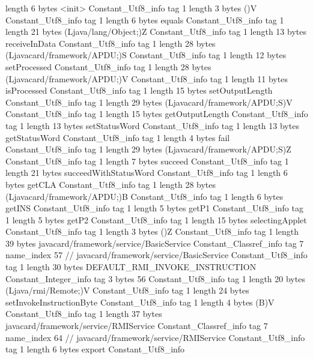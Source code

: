 {{{			length	6
			bytes	<init>
		}
		Constant_Utf8_info {
			tag	1
			length	3
			bytes	()V
		}
		Constant_Utf8_info {
			tag	1
			length	6
			bytes	equals
		}
		Constant_Utf8_info {
			tag	1
			length	21
			bytes	(Ljava/lang/Object;)Z
		}
		Constant_Utf8_info {
			tag	1
			length	13
			bytes	receiveInData
		}
		Constant_Utf8_info {
			tag	1
			length	28
			bytes	(Ljavacard/framework/APDU;)S
		}
		Constant_Utf8_info {
			tag	1
			length	12
			bytes	setProcessed
		}
		Constant_Utf8_info {
			tag	1
			length	28
			bytes	(Ljavacard/framework/APDU;)V
		}
		Constant_Utf8_info {
			tag	1
			length	11
			bytes	isProcessed
		}
		Constant_Utf8_info {
			tag	1
			length	15
			bytes	setOutputLength
		}
		Constant_Utf8_info {
			tag	1
			length	29
			bytes	(Ljavacard/framework/APDU;S)V
		}
		Constant_Utf8_info {
			tag	1
			length	15
			bytes	getOutputLength
		}
		Constant_Utf8_info {
			tag	1
			length	13
			bytes	setStatusWord
		}
		Constant_Utf8_info {
			tag	1
			length	13
			bytes	getStatusWord
		}
		Constant_Utf8_info {
			tag	1
			length	4
			bytes	fail
		}
		Constant_Utf8_info {
			tag	1
			length	29
			bytes	(Ljavacard/framework/APDU;S)Z
		}
		Constant_Utf8_info {
			tag	1
			length	7
			bytes	succeed
		}
		Constant_Utf8_info {
			tag	1
			length	21
			bytes	succeedWithStatusWord
		}
		Constant_Utf8_info {
			tag	1
			length	6
			bytes	getCLA
		}
		Constant_Utf8_info {
			tag	1
			length	28
			bytes	(Ljavacard/framework/APDU;)B
		}
		Constant_Utf8_info {
			tag	1
			length	6
			bytes	getINS
		}
		Constant_Utf8_info {
			tag	1
			length	5
			bytes	getP1
		}
		Constant_Utf8_info {
			tag	1
			length	5
			bytes	getP2
		}
		Constant_Utf8_info {
			tag	1
			length	15
			bytes	selectingApplet
		}
		Constant_Utf8_info {
			tag	1
			length	3
			bytes	()Z
		}
		Constant_Utf8_info {
			tag	1
			length	39
			bytes	javacard/framework/service/BasicService
		}
		Constant_Classref_info {
			tag	7
			name_index	57		// javacard/framework/service/BasicService
		}
		Constant_Utf8_info {
			tag	1
			length	30
			bytes	DEFAULT_RMI_INVOKE_INSTRUCTION
		}
		Constant_Integer_info {
			tag	3
			bytes	56
		}
		Constant_Utf8_info {
			tag	1
			length	20
			bytes	(Ljava/rmi/Remote;)V
		}
		Constant_Utf8_info {
			tag	1
			length	24
			bytes	setInvokeInstructionByte
		}
		Constant_Utf8_info {
			tag	1
			length	4
			bytes	(B)V
		}
		Constant_Utf8_info {
			tag	1
			length	37
			bytes	javacard/framework/service/RMIService
		}
		Constant_Classref_info {
			tag	7
			name_index	64		// javacard/framework/service/RMIService
		}
		Constant_Utf8_info {
			tag	1
			length	6
			bytes	export
		}
		Constant_Utf8_info {
}}}
